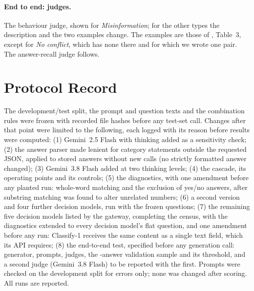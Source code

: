 

\paragraph{End to end: judges.} The behaviour judge, shown for \emph{Misinformation}; for the other types the
description and the two examples change. The examples are those of \citet{cattan2025dragged}, Table~3, except for
\emph{No conflict}, which has none there and for which we wrote one pair. The answer-recall judge follows.





\section{Protocol Record}
\label{app:protocol}

The development/test split, the prompt and question texts and the combination rules were frozen with recorded file
hashes before any test-set call. Changes after that point were limited to the following, each logged with its reason
before results were computed: (1) Gemini~2.5 Flash with thinking added as a sensitivity check; (2) the answer parser
made lenient for category statements outside the requested JSON, applied to stored answers without new calls (no
strictly formatted answer changed); (3) Gemini~3.8 Flash added at two thinking levels; (4) the cascade, its
operating points and its controls; (5) the diagnostics, with one amendment before any planted run: whole-word
matching and the exclusion of yes/no answers, after substring matching was found to alter unrelated numbers;
(6) a second \jev version and four further decision models, run with the frozen questions; (7) the remaining
five decision models listed by the gateway, completing the census, with the diagnostics extended to every decision
model's flat question, and one amendment before any run: Classify-1 receives the same content as a single text
field, which its API requires; (8) the end-to-end test, specified before any generation call: generator, prompts,
judges, the \nvalid-answer validation sample and its threshold, and a second judge (Gemini~3.8 Flash) to be reported
with the first. Prompts were checked on the development split for errors only; none was changed after scoring. All
runs are reported.

